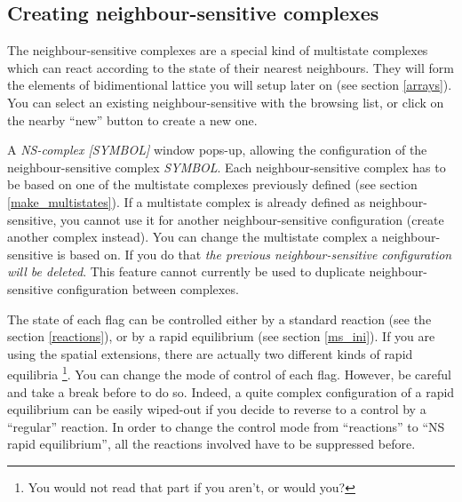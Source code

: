 \subsection{Creating neighbour-sensitive complexes}\label{neighboursensitive}

The neighbour-sensitive complexes are a special kind of multistate complexes
which can react according to the state of their nearest neighbours. They will
form the elements of bidimentional lattice you will setup later on (see section
\ref{arrays}). You can select an existing neighbour-sensitive with the browsing
list, or click on the nearby ``new'' button to create a new one.

 A
\emph{NS-complex [SYMBOL]} window pops-up, allowing the configuration of the
neighbour-sensitive complex \emph{SYMBOL}.  Each neighbour-sensitive complex has
to be based on one of the multistate complexes previously defined (see section
\ref{make_multistates}). If a multistate complex is already defined as
neighbour-sensitive, you cannot use it for another neighbour-sensitive
configuration (create another complex instead). You can change the multistate
complex a neighbour-sensitive is based on. If you do that \emph{the previous
  neighbour-sensitive configuration will be deleted}. This feature cannot
currently be used to duplicate neighbour-sensitive configuration between
complexes.

The state of each flag can be controlled either by a standard reaction (see the
section \ref{reactions}), or by a rapid equilibrium (see section \ref{ms_ini}).
If you are using the spatial extensions, there are actually two different kinds
of rapid equilibria \footnote{You would not read that part if you aren't, or
  would you?}. You can change the mode of control of each flag.  However, be
careful and take a break before to do so. Indeed, a quite complex configuration
of a rapid equilibrium can be easily wiped-out if you decide to reverse to a
control by a ``regular'' reaction.  In order to change the control mode from
``reactions'' to ``NS rapid equilibrium'', all the reactions involved have to be
suppressed before.

